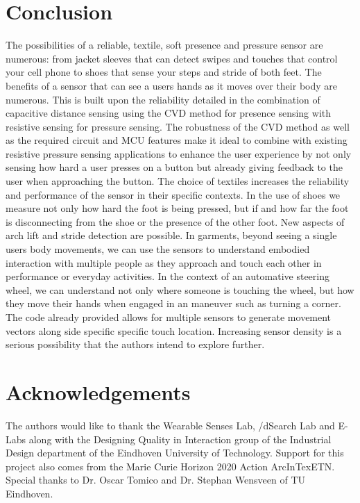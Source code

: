 \documentclass{sigchi-ext}
\begin{document}


\section{Conclusion}
The possibilities of a reliable, textile, soft presence and pressure sensor are numerous: from jacket sleeves that can detect swipes and touches that control your cell phone to shoes that sense your steps and stride of both feet. The benefits of a sensor that can see a users hands as it moves over their body are numerous. This is built upon the reliability detailed in the combination of capacitive distance sensing using the CVD method for presence sensing with resistive sensing for pressure sensing. The robustness of the CVD method as well as the required circuit and MCU features make it ideal to combine with existing resistive pressure sensing applications to enhance the user experience by not only sensing how hard a user presses on a button but already giving feedback to the user when approaching the button. The choice of textiles increases the reliability and performance of the sensor in their specific contexts. In the use of shoes we measure not only how hard the foot is being pressed, but if and how far the foot is disconnecting from the shoe or the presence of the other foot. New aspects of arch lift and stride detection are possible. In garments, beyond seeing a single users body movements, we can use the sensors to understand embodied interaction with multiple people as they approach and touch each other in performance or everyday activities. In the context of an automative steering wheel, we can understand not only where someone is touching the wheel, but how they move their hands when engaged in an maneuver such as turning a corner. The code already provided allows for multiple sensors to generate movement vectors along side specific specific touch location. Increasing sensor density is a serious possibility that the authors intend to explore further. 

\section{Acknowledgements}
The authors would like to thank the Wearable Senses Lab, /dSearch Lab and E-Labs
along with the Designing Quality in Interaction group of the Industrial Design
department of the Eindhoven University of Technology. Support for this project
also comes from the Marie Curie Horizon 2020 Action ArcInTexETN. Special thanks
to Dr. Oscar Tomico and Dr. Stephan Wensveen of TU Eindhoven.

\balance{} 


\end{document}
